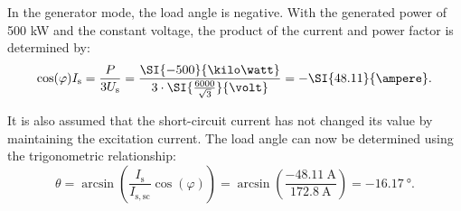 \begin{solutionblock}
    In the generator mode, the load angle is negative. With the generated power of 500 kW and the constant voltage, the product of the current and power factor is determined by:
    \begin{equation}
        \cos(\varphi) I_{\mathrm{s}} = \frac{P}{3 U_{\mathrm{s}}}
        = \frac{\SI{-500}{\kilo\watt}}{3\cdot \SI{\frac{6000}{\sqrt{3}}}{\volt}}
        = -\SI{48.11}{\ampere}.
    \end{equation}

    It is also assumed that the short-circuit current has not changed its value by maintaining the excitation current. The load angle can now be determined using the trigonometric relationship:
    \begin{equation}
        \theta = \arcsin\left(\frac{I_{\mathrm{s}}}{I_{\mathrm{s,sc}}}\cos(\varphi)\right)
        = \arcsin\left(\frac{\SI{-48.11}{\ampere}}{\SI{172.8}{\ampere}}\right)
        = \SI{-16.17}{\degree}.
    \end{equation}
\end{solutionblock}



